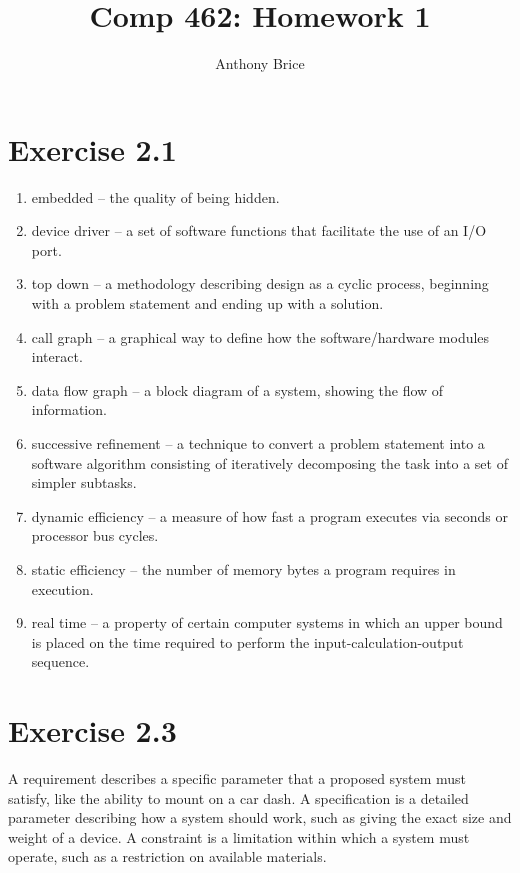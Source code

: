 \documentclass{abrice}
\title{Comp 462: Homework 1}
\author{Anthony Brice}
\begin{document}
\maketitle

\section{Exercise 2.1}

\begin{enumerate}[label=\alph*)]
\item embedded -- the quality of being hidden.
\item device driver -- a set of software functions that facilitate the use of
  an I/O port.
\item top down -- a methodology describing design as a cyclic process, beginning
  with a problem statement and ending up with a solution.
\item call graph -- a graphical way to define how the software/hardware modules
  interact.
\item data flow graph -- a block diagram of a system, showing the flow of
  information.
\item successive refinement -- a technique to convert a problem statement into a
  software algorithm consisting of iteratively decomposing the task into a set
  of simpler subtasks.
\item dynamic efficiency -- a measure of how fast a program executes via seconds
  or processor bus cycles.
\item static efficiency -- the number of memory bytes a program requires in
  execution.
\item real time -- a property of certain computer systems in which an upper
  bound is placed on the time required to perform the input-calculation-output
  sequence.
\end{enumerate}

\section{Exercise 2.3}

A requirement describes a specific parameter that a proposed system must
satisfy, like the ability to mount on a car dash. A specification is a detailed
parameter describing how a system should work, such as giving the exact size and
weight of a device. A constraint is a limitation within which a system must
operate, such as a restriction on available materials.
\end{document}
